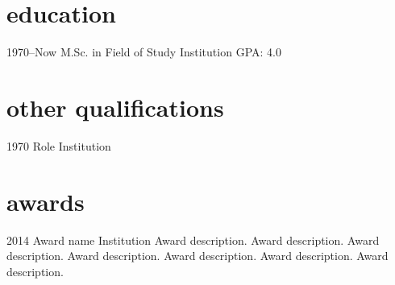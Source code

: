 \documentclass[]{cv-style}          %
\begin{document}

\section{education}

\begin{entrylist}
\entry
{1970--Now}
{M.Sc. {\normalfont in Field of Study}}
{Institution}
{GPA: 4.0}
\end{entrylist}


\section{other qualifications}

\begin{entrylist}
\entry
{1970}
{Role}
{Institution}
{\vspace{-0.3cm}}
\end{entrylist}


\section{awards}

\begin{entrylist}
\entry
{2014}
{Award name}
{Institution}
{Award description. Award description. Award description. Award description. Award description. Award description. Award description. }
\end{entrylist}

\end{document}
